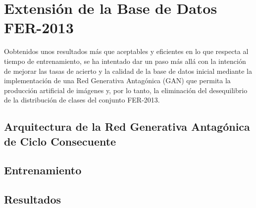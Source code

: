 \chapter{Extensión de la Base de Datos FER-2013} \label{Chapter:6}

Oobtenidos unos resultados más que aceptables y eficientes en lo que respecta al tiempo de entrenamiento, se ha intentado dar un paso más allá con la intención de mejorar las tasas de acierto y la calidad de la base de datos inicial mediante la implementación de una Red Generativa Antagónica (GAN) que permita la producción artificial de imágenes y, por lo tanto, la eliminación del desequilibrio de la distribución de clases del conjunto FER-2013.

\section{Arquitectura de la Red Generativa Antagónica de Ciclo Consecuente}

\section{Entrenamiento}

\section{Resultados}